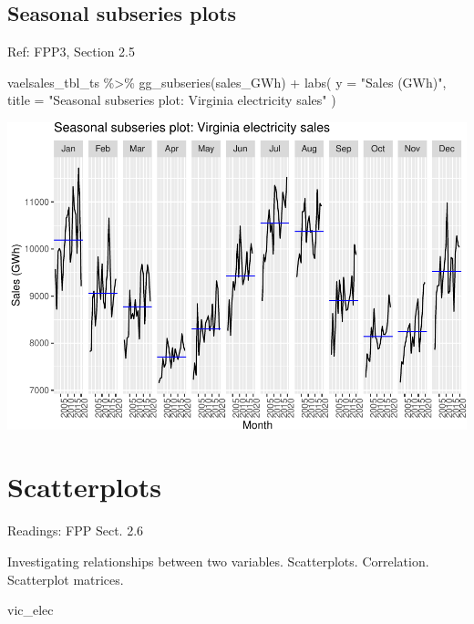 \documentclass[
]{book}
\newenvironment{Shaded}{\begin{snugshade}}{\end{snugshade}}
\newcommand{\AttributeTok}[1]{\textcolor[rgb]{0.77,0.63,0.00}{#1}}
\newcommand{\FunctionTok}[1]{\textcolor[rgb]{0.00,0.00,0.00}{#1}}
\newcommand{\NormalTok}[1]{#1}
\newcommand{\SpecialCharTok}[1]{\textcolor[rgb]{0.00,0.00,0.00}{#1}}
\newcommand{\StringTok}[1]{\textcolor[rgb]{0.31,0.60,0.02}{#1}}
\begin{document}
\hypertarget{seasonal-subseries-plots}{%
\subsection{Seasonal subseries plots}\label{seasonal-subseries-plots}}

Ref: FPP3, Section 2.5

\begin{Shaded}
\begin{Highlighting}[]
\NormalTok{vaelsales\_tbl\_ts }\SpecialCharTok{\%\textgreater{}\%}
  \FunctionTok{gg\_subseries}\NormalTok{(sales\_GWh) }\SpecialCharTok{+}
  \FunctionTok{labs}\NormalTok{(}
    \AttributeTok{y =} \StringTok{"Sales (GWh)"}\NormalTok{,}
    \AttributeTok{title =} \StringTok{"Seasonal subseries plot: Virginia electricity sales"}
\NormalTok{  )}
\end{Highlighting}
\end{Shaded}

\includegraphics{graphics/unnamed-chunk-18-1.pdf}

\hypertarget{scatterplots}{%
\section{Scatterplots}\label{scatterplots}}

Readings: FPP Sect. 2.6

Investigating relationships between two variables. Scatterplots. Correlation. Scatterplot matrices.

\begin{Shaded}
\begin{Highlighting}[]
\NormalTok{vic\_elec}
\end{Highlighting}
\end{Shaded}
\end{document}
